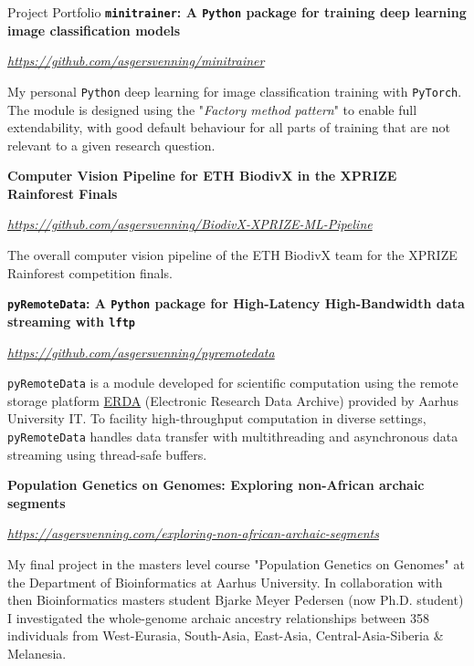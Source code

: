 
\begin{rubric}{Project Portfolio}
%
    \textbf{\texttt{mini\textunderscore trainer}: A \texttt{Python} package for training deep learning image classification models}\par
    \href{https://github.com/asgersvenning/mini_trainer}{\color{blue}\textit{https://github.com/asgersvenning/mini\textunderscore trainer}}\par
    \pind My personal \texttt{Python} deep learning for image classification training with \texttt{PyTorch}. The module is designed using the "\textit{Factory method pattern}" to enable full extendability, with good default behaviour for all parts of training that are not relevant to a given research question.

%
    \textbf{Computer Vision Pipeline for ETH BiodivX in the XPRIZE Rainforest Finals}\par
    \href{https://github.com/asgersvenning/BiodivX-XPRIZE-ML-Pipeline}{\color{blue}\textit{https://github.com/asgersvenning/BiodivX-XPRIZE-ML-Pipeline}}\par
    \pind The overall computer vision pipeline of the ETH BiodivX team for the XPRIZE Rainforest competition finals.

%
    \textbf{\texttt{pyRemoteData}: A \texttt{Python} package for High-Latency High-Bandwidth data streaming with \texttt{lftp}}\par
    \href{https://github.com/asgersvenning/pyremotedata}{\color{blue}\textit{https://github.com/asgersvenning/pyremotedata}}\par
    \pind \texttt{pyRemoteData} is a module developed for scientific computation using the remote storage platform \href{https://erda.au.dk/}{ERDA} (Electronic Research Data Archive) provided by Aarhus University IT. To facility high-throughput computation in diverse settings, \mbox{\texttt{pyRemoteData}} handles data transfer with multithreading and asynchronous data streaming using thread-safe buffers.

%
    \textbf{Population Genetics on Genomes: Exploring non-African archaic segments}\par
    \href{https://asgersvenning.com/exploring-non-african-archaic-segments}{\color{blue}\textit{https://asgersvenning.com/exploring-non-african-archaic-segments}}\par
    \pind My final project in the masters level course "Population Genetics on Genomes" at the Department of Bioinformatics at Aarhus University. In collaboration with then Bioinformatics masters student Bjarke Meyer Pedersen (now Ph.D. student) I investigated the whole-genome archaic ancestry relationships between 358 individuals from West-Eurasia, South-Asia, East-Asia, Central-Asia-Siberia \& Melanesia.


\end{rubric}
